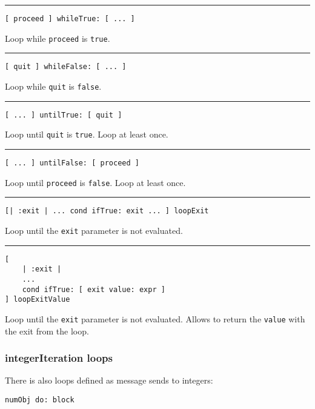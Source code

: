 \documentclass[10pt]{article}
\begin{document}
\begin{multicols*}{3}
\vspace*{0.2cm}
\hrule

\begin{lstlisting}
[ proceed ] whileTrue: [ ... ]
\end{lstlisting}
Loop while \texttt{proceed} is \texttt{true}.

\vspace*{0.2cm}
\hrule

\begin{lstlisting}
[ quit ] whileFalse: [ ... ]
\end{lstlisting}
Loop while \texttt{quit} is \texttt{false}.

\vspace*{0.2cm}
\hrule

\begin{lstlisting}
[ ... ] untilTrue: [ quit ]
\end{lstlisting}
Loop until \texttt{quit} is \texttt{true}. Loop at least once.

\vspace*{0.2cm}
\hrule

\begin{lstlisting}
[ ... ] untilFalse: [ proceed ]
\end{lstlisting}
Loop until \texttt{proceed} is \texttt{false}. Loop at least once.

\vspace*{0.2cm}
\hrule

\begin{lstlisting}
[| :exit | ... cond ifTrue: exit ... ] loopExit
\end{lstlisting}
Loop until the \texttt{exit} parameter is not evaluated.

\vspace*{0.2cm}
\hrule

\begin{lstlisting}
[
    | :exit |
    ...
    cond ifTrue: [ exit value: expr ]
] loopExitValue
\end{lstlisting}
Loop until the \texttt{exit} parameter is not evaluated. Allows to return the \texttt{value} with the exit from the loop.




\subsubsection{integerIteration loops}

There is also loops defined as message sends to integers:

\begin{lstlisting}
numObj do: block
\end{lstlisting}


\end{multicols*}
\end{document}
